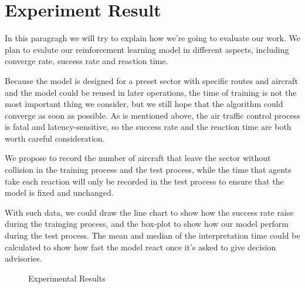 
\section{Experiment Result}

In this paragragh we will try to explain how we're going to evaluate our work. We plan to evalute our reinforcement learning model in different aspects, including converge rate, suceess rate and reaction time.

Because the model is designed for a preset sector with specific routes and aircraft and the model could be reused in later operations, the time of training is not the most important thing we consider, but we still hope that the algorithm could converge as soon as possible. As is mentioned above, the air traffic control process is fatal and latency-sensitive, so the success rate and the reaction time are both worth careful consideration.

We propose to record the number of aircraft that leave the sector without collision in the training process and the test process, while the time that agents take each reaction will only be recorded in the test process to ensure that the model is fixed and unchanged.

With such data, we could draw the line chart to show how the success rate raise during the trainging process, and the box-plot to show how our model perform during the test process. The mean and median of the interpretation time could be calculated to show how fast the model react once it's asked to give decision advisories.

\begin{figure}[!htbp]
    \centering
    \caption{Experimental Results}
    \label{fig:exp_result}
\end{figure}

